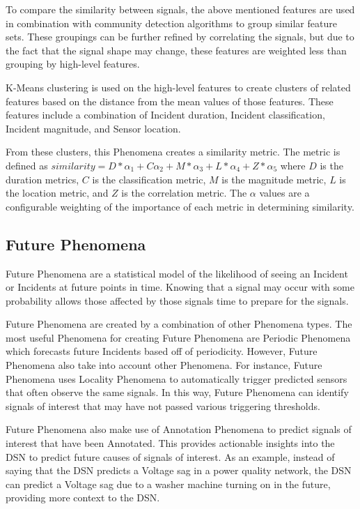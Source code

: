 To compare the similarity between signals, the above mentioned features are used in combination with community detection algorithms to group similar feature sets. These groupings can be further refined by correlating the signals, but due to the fact that the signal shape may change, these features are weighted less than grouping by high-level features.

K-Means clustering is used on the high-level features to create clusters of related features based on the distance from the mean values of those features. These features include a combination of Incident duration, Incident classification, Incident magnitude, and Sensor location.

From these clusters, this Phenomena creates a similarity metric. The metric is defined as $similarity = D*\alpha_1 + C\alpha_2 + M*\alpha_3 + L*\alpha_4 + Z*\alpha_5$ where $D$ is the duration metrics, $C$ is the classification metric, $M$ is the magnitude metric, $L$ is the location metric, and $Z$ is the correlation metric. The $\alpha$ values are a configurable weighting of the importance of each metric in determining similarity.

\subsection{Future Phenomena}\label{subsec:future-phenomena}
Future Phenomena are a statistical model of the likelihood of seeing an Incident or Incidents at future points in time. Knowing that a signal may occur with some probability allows those affected by those signals time to prepare for the signals.

Future Phenomena are created by a combination of other Phenomena types. The most useful Phenomena for creating Future Phenomena are Periodic Phenomena which forecasts future Incidents based off of periodicity. However, Future Phenomena also take into account other Phenomena. For instance, Future Phenomena uses Locality Phenomena to automatically trigger predicted sensors that often observe the same signals. In this way, Future Phenomena can identify signals of interest that may have not passed various triggering thresholds.

Future Phenomena also make use of Annotation Phenomena to predict signals of interest that have been Annotated. This provides actionable insights into the DSN to predict future causes of signals of interest. As an example, instead of saying that the DSN predicts a Voltage sag in a power quality network, the DSN can predict a Voltage sag due to a washer machine turning on in the future, providing more context to the DSN\@.


